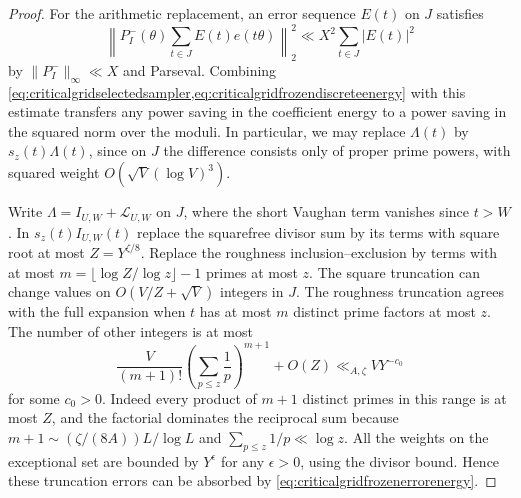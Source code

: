 \documentclass[11pt,a4paper]{article}
\numberwithin{equation}{section}
\begin{document}
\begin{proof}
For the arithmetic replacement, an error sequence $E(t)$
on $J$ satisfies
\begin{equation}
 \left\|P_I^-(\theta)\sum_{t\in J}E(t)e(t\theta)\right\|_2^2
                    \ll X^2\sum_{t\in J}|E(t)|^2
 \label{eq:criticalgridfrozenerrorenergy}
\end{equation}
by $\|P_I^-\|_\infty\ll X$ and Parseval. Combining
\cref{eq:criticalgridselectedsampler,eq:criticalgridfrozendiscreteenergy}
with this estimate transfers any power saving in the
coefficient energy to a power saving in the squared norm
over the moduli. In particular, we may replace $\Lambda(t)$
by $s_z(t)\Lambda(t)$, since on $J$ the difference consists
only of proper prime powers, with squared weight
$O(\sqrt V(\log V)^3)$.

Write $\Lambda=I_{U,W}+\mathcal L_{U,W}$ on $J$, where
the short Vaughan term vanishes since $t>W$. In
$s_z(t) I_{U,W}(t)$ replace the squarefree divisor sum by
its terms with square root at most $Z=Y^{\zeta/8}$.
Replace the roughness inclusion--exclusion by terms with
at most $m=\lfloor \log Z/\log z\rfloor-1$ primes at
most $z$. The square truncation can change values on
$O(V/Z+\sqrt V)$ integers in $J$. The roughness
truncation agrees with the full expansion when $t$ has
at most $m$ distinct prime factors at most $z$.
The number of other integers is at most
\[
 \frac{V}{(m+1)!}
       \left(\sum_{p\le z}\frac1p\right)^{m+1}+O(Z)
              \ll_{A,\zeta} VY^{-c_0}
\]
for some $c_0>0$. Indeed every product of $m+1$ distinct
primes in this range is at most $Z$, and the factorial
dominates the reciprocal sum because
$m+1\sim(\zeta/(8A))L/\log L$ and
$\sum_{p\le z}1/p\ll\log z$. All the weights on the
exceptional set are bounded by $Y^\epsilon$ for any
$\epsilon>0$, using the divisor bound. Hence these
truncation errors can be absorbed by
\cref{eq:criticalgridfrozenerrorenergy}.


\end{proof}
\end{document}
